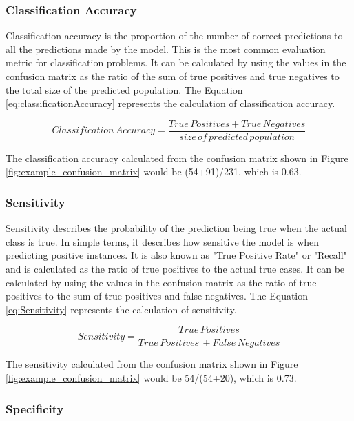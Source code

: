 \documentclass[11pt,openright]{report}
\begin{document}
\subsubsection{Classification Accuracy}
Classification accuracy is the proportion of the number of correct predictions to all the predictions made by the model. This is the most common evaluation metric for classification problems. It can be calculated by using the values in the confusion matrix as the ratio of the sum of true positives and true negatives to the total size of the predicted population. The Equation \ref{eq:classificationAccuracy}  represents the calculation of classification accuracy.

\begin{equation}
Classification\, Accuracy = \dfrac{True\, Positives + True\, Negatives}{size\, of\, predicted\, population} \label{eq:classificationAccuracy} 
 \end{equation}

The classification accuracy calculated from the confusion matrix shown in Figure \ref{fig:example_confusion_matrix} would be (54+91)/231, which is 0.63.

\subsubsection{Sensitivity}

Sensitivity describes the probability of the prediction being true when the actual class is true. In simple terms, it describes how sensitive the model is when predicting positive instances. It is also known as "True Positive Rate" or "Recall" and is calculated as the ratio of true positives to the actual true cases. It can be calculated by using the values in the confusion matrix as the ratio of true positives to the sum of true positives and false negatives. The Equation \ref{eq:Sensitivity}  represents the calculation of sensitivity.

\begin{equation}
Sensitivity = \dfrac{True\, Positives }{True\, Positives\, + False\, Negatives} \label{eq:Sensitivity} 
 \end{equation}

The sensitivity calculated from the confusion matrix shown in Figure \ref{fig:example_confusion_matrix} would be 54/(54+20), which is 0.73.


\subsubsection{Specificity}
\end{document}
